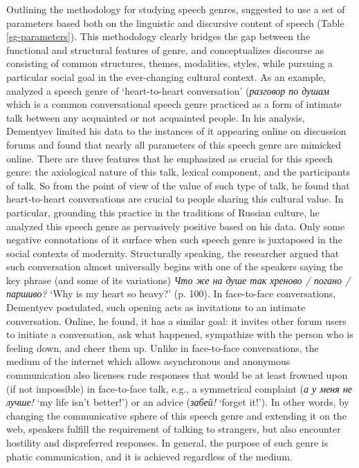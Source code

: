 \documentclass[12pt]{article}
\begin{document}
Outlining the methodology for studying speech genres, \textcite{dementyev2015} suggested to use a set of parameters based both on the linguistic and discursive content of speech (Table \ref{sg-parameters}). This methodology clearly bridges the gap between the functional and structural features of genre, and conceptualizes discourse as consisting of common structures, themes, modalities, styles, while pursuing a particular social goal in the ever-changing cultural context. As an example, \textcite{dementyev2015} analyzed a speech genre of `heart-to-heart conversation' (\foreignlanguage{russian}{\textit{разговор по душам}} which is a common conversational speech genre practiced as a form of intimate talk between any acquainted or not acquainted people. In his analysis, Dementyev limited his data to the instances of it appearing online on discussion forums and found that nearly all parameters of this speech genre are mimicked online. There are three features that he emphasized as crucial for this speech genre: the axiological nature of this talk, lexical component, and the participants of talk. So from the point of view of the value of such type of talk, he found that heart-to-heart conversations are crucial to people sharing this cultural value. In particular, grounding this practice in the traditions of Russian culture, he analyzed this speech genre as pervasively positive based on his data. Only some negative connotations of it surface when such speech genre is juxtaposed in the social contexts of modernity. Structurally speaking, the researcher argued that such conversation almost universally begins with one of the speakers saying the key phrase (and some of its variations) \foreignlanguage{russian}{\textit{Что же на душе так хреново / погано / паршиво?}} `Why is my heart so heavy?' (p. 100). In face-to-face conversations, Dementyev postulated, such  opening acts as  invitations to an intimate conversation. Online, he found, it has a similar goal: it invites other forum users to initiate a conversation, ask what happened, sympathize with the person who is feeling down, and cheer them up. Unlike in face-to-face conversations, the medium of the internet which allows asynchronous and anonymous communication also licenses rude responses that would be at least frowned upon (if not impossible) in face-to-face talk, e.g., a symmetrical complaint (\foreignlanguage{russian}{\textit{а у меня не лучше!} `my life isn't better!'}) or an advice (\foreignlanguage{russian}{\textit{забей!}} `forget it!'). In other words, by changing the communicative sphere of this speech genre and extending it on the web, speakers fulfill the requirement of talking to strangers, but also encounter hostility and dispreferred responses. In general, the purpose of such genre is phatic communication, and it is achieved regardless of the medium.
\end{document}
